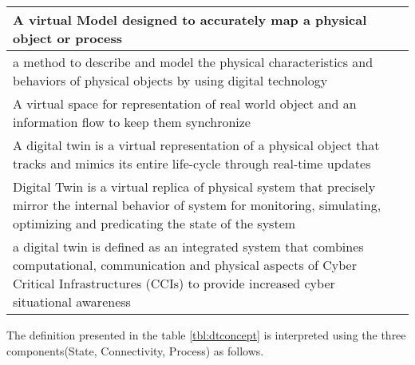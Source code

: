 \begin{table}[h]
{\begin{NiceTabular}{p{10cm}|p{4cm}}
    
    \hline
    A virtual Model designed to accurately map a physical object or process & \cite{wangDTCPNDigitalTwin2022, sousaELEGANTSecurityCritical2021} \\
    
    \hline
    a method to describe and model the physical characteristics and behaviors of physical objects by using digital technology & \cite{wangSoCbasedDigitalTwin2020} \\
    
    \hline
    A virtual space for representation of real world object and an information flow to keep them synchronize  & \cite{giovannipaolosellittoEnablingZeroTrust2021}\\
    
    \hline
    A digital twin is a virtual representation of a physical object that tracks and mimics its entire life-cycle through real-time updates & \cite{vargheseDigitalTwinbasedIntrusion2022, dietzUnleashingDigitalTwin2020} \\
    
    \hline
    Digital Twin is a virtual replica of physical system that precisely mirror the internal behavior of system for monitoring, simulating, optimizing and predicating the state of the system & \cite{akbarianSecurityFrameworkDigital2021, akbarianIntrusionDetectionDigital2020} \\
    
    \hline
    a digital twin is defined as an integrated system that combines computational, communication and physical aspects of Cyber Critical Infrastructures (CCIs) to provide increased cyber situational awareness & \cite{salviCyberresilienceCriticalCyber2022, pirbhulalNovelFrameworkReinforcing2022} \\

    \hline
    
    
\bottomrule
\end{NiceTabular}
}
\end{table}


The definition presented in the table  \ref{tbl:dtconcept} is interpreted using the three components(State, Connectivity, Process) as follows.  

